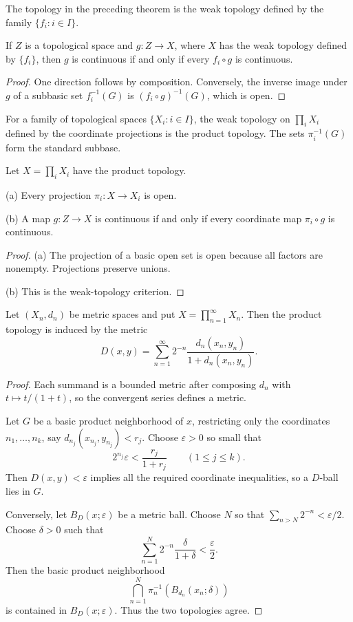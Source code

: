 \begin{de}
The topology in the preceding theorem is the weak topology defined by the
family $\{f_i:i\in I\}$.
\end{de}

\begin{cor}
If $Z$ is a topological space and $g:Z\to X$, where $X$ has the weak topology
defined by $\{f_i\}$, then $g$ is continuous if and only if every
$f_i\circ g$ is continuous.
\end{cor}

\begin{proof}
One direction follows by composition. Conversely, the inverse image under
$g$ of a subbasic set $f_i^{-1}(G)$ is
$(f_i\circ g)^{-1}(G)$, which is open.
\end{proof}

\begin{de}
For a family of topological spaces $\{X_i:i\in I\}$, the weak topology on
$\prod_iX_i$ defined by the coordinate projections is the product topology.
The sets $\pi_i^{-1}(G)$ form the standard subbase.
\end{de}

\begin{thm}
Let $X=\prod_iX_i$ have the product topology.

(a) Every projection $\pi_i:X\to X_i$ is open.

(b) A map $g:Z\to X$ is continuous if and only if every coordinate map
$\pi_i\circ g$ is continuous.
\end{thm}

\begin{proof}
(a) The projection of a basic open set is open because all factors are
nonempty. Projections preserve unions.

(b) This is the weak-topology criterion.
\end{proof}

\begin{thm}
Let $(X_n,d_n)$ be metric spaces and put $X=\prod_{n=1}^\infty X_n$. Then the
product topology is induced by the metric
\[
D(x,y)=\sum_{n=1}^\infty2^{-n}
\frac{d_n(x_n,y_n)}{1+d_n(x_n,y_n)}.
\]
\end{thm}

\begin{proof}
Each summand is a bounded metric after composing $d_n$ with
$t\mapsto t/(1+t)$, so the convergent series defines a metric.

Let $G$ be a basic product neighborhood of $x$, restricting only the
coordinates $n_1,\ldots,n_k$, say
$d_{n_j}(x_{n_j},y_{n_j})<r_j$. Choose $\varepsilon>0$ so small that
\[
2^{n_j}\varepsilon<\frac{r_j}{1+r_j}
\qquad(1\leq j\leq k).
\]
Then $D(x,y)<\varepsilon$ implies all the required coordinate inequalities,
so a $D$-ball lies in $G$.

Conversely, let $B_D(x;\varepsilon)$ be a metric ball. Choose $N$ so that
$\sum_{n>N}2^{-n}<\varepsilon/2$. Choose $\delta>0$ such that
\[
\sum_{n=1}^N2^{-n}\frac{\delta}{1+\delta}<\frac{\varepsilon}{2}.
\]
Then the basic product neighborhood
\[
\bigcap_{n=1}^N\pi_n^{-1}(B_{d_n}(x_n;\delta))
\]
is contained in $B_D(x;\varepsilon)$. Thus the two topologies agree.
\end{proof}

